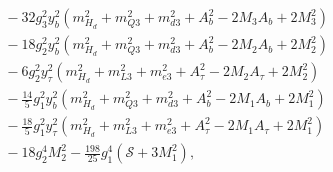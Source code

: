 \documentclass[preprint,amsmath,amssymb,aps,superscriptaddress,prd,showpacs,floatfix]{revtex4-1}
\begin{document}
\begin{subequations}
\begin{align}
&\quad{}-32g_3^2y_b^2\left ( m_{H_d}^2+m_{Q3}^2+m_{d3}^2+A_b^2-2M_3A_b+2M_3^2\right )\nonumber\\
&\quad{}-18g_2^2y_b^2\left ( m_{H_d}^2+m_{Q3}^2+m_{d3}^2+A_b^2-2M_2A_b+2M_2^2\right )\nonumber\\
&\quad{}-6g_2^2y_\tau^2\left ( m_{H_d}^2+m_{L3}^2+m_{e3}^2+A_\tau^2-2M_2A_\tau+2M_2^2\right )\nonumber\\
&\quad{}-\frac{14}{5}g_1^2y_b^2\left ( m_{H_d}^2+m_{Q3}^2+m_{d3}^2+A_b^2-2M_1A_b+2M_1^2\right )\nonumber\\
&\quad{}-\frac{18}{5}g_1^2y_\tau^2\left ( m_{H_d}^2+m_{L3}^2+m_{e3}^2+A_\tau^2-2M_1A_\tau+2M_1^2\right )\nonumber\\
&\quad{}-18g_2^4M_2^2-\frac{198}{25}g_1^4\left ( \mathcal{S}+3M_1^2\right ),\label{eq:MSSMmHd2b2}
\end{align}
\end{subequations}
\end{document}
